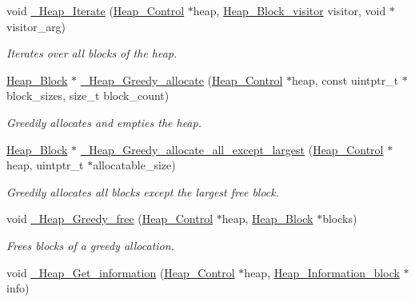 \begin{DoxyCompactItemize}
void \mbox{\hyperlink{group__RTEMSScoreHeap_ga568d8a3b62e8b4b060940770bdeee254}{\+\_\+\+Heap\+\_\+\+Iterate}} (\mbox{\hyperlink{structHeap__Control}{Heap\+\_\+\+Control}} $\ast$heap, \mbox{\hyperlink{group__RTEMSScoreHeap_gab5fc026bfabc31c620545e574d579b64}{Heap\+\_\+\+Block\+\_\+visitor}} visitor, void $\ast$visitor\+\_\+arg)
\begin{DoxyCompactList}\small\item\em Iterates over all blocks of the heap. \end{DoxyCompactList}\item 
\mbox{\hyperlink{structHeap__Block}{Heap\+\_\+\+Block}} $\ast$ \mbox{\hyperlink{group__RTEMSScoreHeap_gae3e5154cbd4e707d42fb39b2e9c565ff}{\+\_\+\+Heap\+\_\+\+Greedy\+\_\+allocate}} (\mbox{\hyperlink{structHeap__Control}{Heap\+\_\+\+Control}} $\ast$heap, const uintptr\+\_\+t $\ast$block\+\_\+sizes, size\+\_\+t block\+\_\+count)
\begin{DoxyCompactList}\small\item\em Greedily allocates and empties the heap. \end{DoxyCompactList}\item 
\mbox{\hyperlink{structHeap__Block}{Heap\+\_\+\+Block}} $\ast$ \mbox{\hyperlink{group__RTEMSScoreHeap_ga7822352d7403927196f2403ec48fc882}{\+\_\+\+Heap\+\_\+\+Greedy\+\_\+allocate\+\_\+all\+\_\+except\+\_\+largest}} (\mbox{\hyperlink{structHeap__Control}{Heap\+\_\+\+Control}} $\ast$heap, uintptr\+\_\+t $\ast$allocatable\+\_\+size)
\begin{DoxyCompactList}\small\item\em Greedily allocates all blocks except the largest free block. \end{DoxyCompactList}\item 
void \mbox{\hyperlink{group__RTEMSScoreHeap_ga01401364d81dc07728aea35aac06e84d}{\+\_\+\+Heap\+\_\+\+Greedy\+\_\+free}} (\mbox{\hyperlink{structHeap__Control}{Heap\+\_\+\+Control}} $\ast$heap, \mbox{\hyperlink{structHeap__Block}{Heap\+\_\+\+Block}} $\ast$blocks)
\begin{DoxyCompactList}\small\item\em Frees blocks of a greedy allocation. \end{DoxyCompactList}\item 
void \mbox{\hyperlink{group__RTEMSScoreHeap_ga5ee6c8f0dfa456002f117bb202b5c9a6}{\+\_\+\+Heap\+\_\+\+Get\+\_\+information}} (\mbox{\hyperlink{structHeap__Control}{Heap\+\_\+\+Control}} $\ast$heap, \mbox{\hyperlink{structHeap__Information__block}{Heap\+\_\+\+Information\+\_\+block}} $\ast$info)

\end{DoxyCompactItemize}
